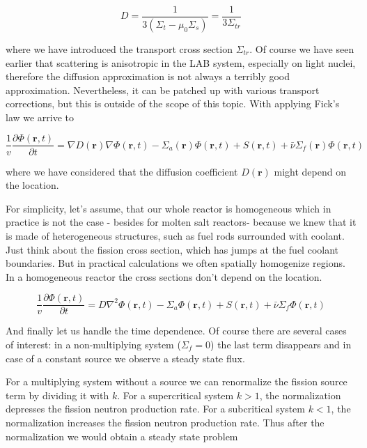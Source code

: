 \begin{equation}
D=\frac{1}{3(\Sigma_t-\mu_0\Sigma_s)}=\frac{1}{3\Sigma_{tr}}
\end{equation}

\noindent where we have introduced the transport cross section $\Sigma_{tr}$. Of course we have seen earlier that scattering is anisotropic in the LAB system, especially on light nuclei, therefore the diffusion approximation is not always a terribly good approximation. Nevertheless, it can be patched up with various transport corrections, but this is outside of the scope of this topic. With applying Fick's law we arrive to

\begin{equation}
\frac{1}{v}\frac{\partial\Phi(\mathbf{r},t)}{\partial t}=\nabla D(\mathbf{r})\nabla \Phi(\mathbf{r},t)-\Sigma_a(\mathbf{r})\Phi(\mathbf{r},t)+S(\mathbf{r},t) 
+\bar\nu\Sigma_f(\mathbf{r})\Phi(\mathbf{r},t)
\end{equation}

\noindent where we have considered that the diffusion coefficient $D(\mathbf{r})$ might depend on the location. 

For simplicity, let's assume, that our whole reactor is homogeneous which in practice is not the case - besides for molten salt reactors- because we knew that it is made of heterogeneous structures, such as fuel rods surrounded with coolant. Just think about the fission cross section, which has jumps at the fuel coolant boundaries. But in practical calculations we often spatially homogenize regions. In a homogeneous reactor the cross sections don't depend on the location. 

\begin{equation}
\frac{1}{v}\frac{\partial\Phi(\mathbf{r},t)}{\partial t}=D\nabla^2 \Phi(\mathbf{r},t)-\Sigma_a\Phi(\mathbf{r},t)+S(\mathbf{r},t) 
+\bar\nu\Sigma_f\Phi(\mathbf{r},t)
\end{equation}

And finally let us handle the time dependence. Of course there are several cases of interest: in a non-multiplying system ($\Sigma_f=0$) the last term disappears and in case of a constant source we observe a steady state flux. 

For a multiplying system without a source we can renormalize the fission source term by dividing it with $k$. For a supercritical system $k > 1$, the normalization depresses the fission neutron production rate. For a subcritical system $k < 1$, the normalization increases the fission neutron production rate. Thus after the normalization we would obtain a steady state problem

